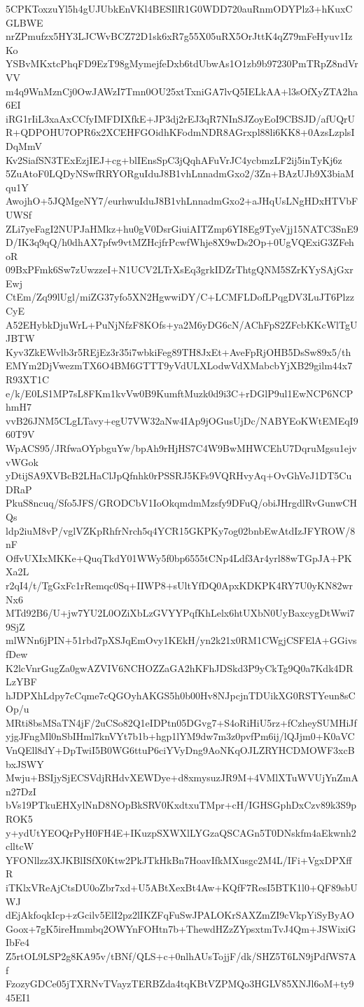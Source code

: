 5CPKToxzuYl5h4gUJUbkEnVKl4BESIlR1G0WDD720auRnmODYPlz3+hKuxCGLBWE
nrZPmufzx5HY3LJCWvBCZ72D1sk6xR7g55X05uRX5OrJttK4qZ79mFeHyuv1IzKo
YSBvMKxtcPhqFD9EzT98gMymejfeDxb6tdUbwAs1O1zb9b97230PmTRpZ8ndVrVV
m4q9WnMznCj0OwJAWzI7Tmn0OU25xtTxniGA7lvQ5IELkAA+l3sOfXyZTA2ha6EI
iRG1rIiL3xaAxCCfyIMFDIXfkE+JP3dj2rEJ3qR7NInSJZoyEoI9CBSJD/afUQrU
R+QDPOHU7OPR6x2XCEHFGOidhKFodmNDR8AGrxpl88li6KK8+0AzsLzplsIDqMmV
Kv2SiafSN3TExEzjIEJ+cg+blIEnsSpC3jQqhAFuVrJC4ycbmzLF2ij5inTyKj6z
5ZuAtoF0LQDyNSwfRRYORguIduJ8B1vhLnnadmGxo2/3Zn+BAzUJb9X3biaMqu1Y
AwojhO+5JQMgeNY7/eurhwuIduJ8B1vhLnnadmGxo2+aJHqUsLNgHDxHTVbFUWSf
ZLi7yeFagI2NUPJaHMkz+hu0gV0DsrGiuiAITZmp6YI8Eg9TyeVjj15NATC3SnE9
D/IK3q9qQ/h0dhAX7pfw9vtMZHcjfrPcwfWhje8X9wDs2Op+0UgVQExiG3ZFehoR
09BxPFmk6Sw7zUwzzeI+N1UCV2LTrXsEq3grkIDZrThtgQNM5SZrKYySAjGxrEwj
CtEm/Zq99lUgl/miZG37yfo5XN2HgwwiDY/C+LCMFLDofLPqgDV3LuJT6PlzzCyE
A52EHybkDjuWrL+PuNjNfzF8KOfs+ya2M6yDG6cN/AChFpS2ZFcbKKcWlTgUJBTW
Kyv3ZkEWvlb3r5REjEz3r35i7wbkiFeg89TH8JxEt+AveFpRjOHB5DsSw89x5/th
EMYm2DjVwezmTX6O4BM6GTTT9yVdULXLodwVdXMabcbYjXB29gilm44x7R93XT1C
e/k/E0LS1MP7sL8FKm1kvVw0B9KumftMuzk0d9i3C+rDGlP9ul1EwNCP6NCPhmH7
vvB26JNM5CLgLTavy+egU7VW32aNw4IAp9jOGusUjDc/NABYEoKWtEMEqI960T9V
WpACS95/JRfwaOYpbguYw/bpAh9rHjHS7C4W9BwMHWCEhU7DqruMgsu1ejvvWGok
yDtijSA9XVBcB2LHaClJpQfnhk0rPSSRJ5KFs9VQRHvyAq+OvGhVeJ1DT5CuDRaP
PkuS8ncuq/Sfo5JFS/GRODCbV1IoOkqmdmMzsfy9DFuQ/obiJHrgdlRvGunwCHQs
ldp2iuM8vP/vglVZKpRhfrNrch5q4YCR15GKPKy7og02bnbEwAtdIzJFYROW/8nF
OffvUXIxMKKe+QuqTkdY01WWy5f0bp6555tCNp4Ldf3Ar4yrl88wTGpJA+PKXa2L
r2qI4/t/TgGxFc1rRemqc0Sq+IIWP8+sUltYfDQ0ApxKDKPK4RY7U0yKN82wrNx6
MTd92B6/U+jw7YU2L0OZiXbLzGVYYPqfKhLelx6htUXbN0UyBaxcygDtWwi79SjZ
mlWNn6jPIN+51rbd7pXSJqEmOvy1KEkH/yn2k21x0RM1CWgjCSFElA+GGivsfDew
K2lcVnrGugZa0gwAZVIV6NCHOZZaGA2hKFhJDSkd3P9yCkTg9Q0a7Kdk4DRLzYBF
hJDPXhLdpy7cCqme7cQGOyhAKGS5h0b00Hv8NJpcjnTDUikXG0RSTYeun8sCOp/u
MRti8bsMSaTN4jF/2uCSo82Q1eIDPtn05DGvg7+S4oRiHiU5rz+fCzheySUMHiJf
yjgJFngMl0nSbIHml7knVYt7b1b+hgp1lYM9dw7m3z0pvfPm6ij/lQJjm0+K0aVC
VnQEll8dY+DpTwiI5B0WG6ttuP6ciYVyDng9AoNKqOJLZRYHCDMOWF3xcBbxJSWY
Mwju+BSIjySjECSVdjRHdvXEWDye+d8xmysuzJR9M+4VMlXTuWVUjYnZmAn27DzI
bVs19PTkuEHXylNnD8NOpBkSRV0KxdtxuTMpr+cH/IGHSGphDxCzv89k3S9pROK5
y+ydUtYEOQrPyH0FH4E+IKuzpSXWXlLYGzaQSCAGn5T0DNskfm4aEkwnh2clltcW
YFONllzz3XJKBlISfX0Ktw2PkJTkHkBn7HoavIfkMXusgc2M4L/IFi+VgxDPXffR
iTKlxVReAjCtsDU0oZbr7xd+U5ABtXexBt4Aw+KQfF7ResI5BTK1l0+QF89sbUWJ
dEjAkfoqkIcp+zGcilv5ElI2pz2lIKZFqFuSwJPALOKrSAXZmZI9cVkpYiSyByAO
Goox+7gK5ireHmmbq2OWYnFOHtn7b+ThewdHZzZYpsxtmTvJ4Qm+JSWixiGIbFe4
Z5rtOL9LSP2g8KA95v/tBNf/QLS+c+0nlhAUsTojjF/dk/SHZ5T6LN9jPdfWS7Af
FzozyGDCe05jTXRNvTVayzTERBZda4tqKBtVZPMQo3HGLV85XNJl6oM+ty945EI1
